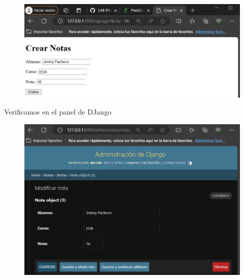 \documentclass{article}
\begin{document}
     \begin{figure}[H]
           \centering
           \includegraphics[scale=0.6]{latex/img/img12.png}
     \end{figure}
     
 \item Verificamos en el panel de DJango

     \begin{figure}[H]
           \centering
           \includegraphics[scale=0.6]{latex/img/img13.png}
     \end{figure}

     
\end{document}
